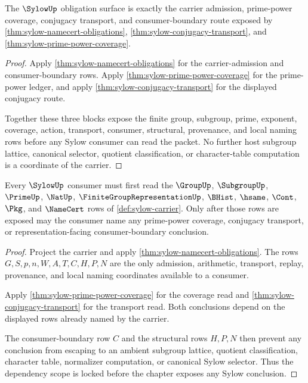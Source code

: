 \begin{theorem}
\label{thm:sylow-obligation-closure-surface}
The $\SylowUp$ obligation surface is exactly the carrier admission, prime-power coverage, conjugacy transport, and consumer-boundary route exposed by \autoref{thm:sylow-namecert-obligations}, \autoref{thm:sylow-conjugacy-transport}, and \autoref{thm:sylow-prime-power-coverage}.
\end{theorem}
\begin{proof}
Apply \autoref{thm:sylow-namecert-obligations} for the carrier-admission and consumer-boundary rows. Apply \autoref{thm:sylow-prime-power-coverage} for the prime-power ledger, and apply \autoref{thm:sylow-conjugacy-transport} for the displayed conjugacy route.

Together these three blocks expose the finite group, subgroup, prime, exponent, coverage, action, transport, consumer, structural, provenance, and local naming rows before any Sylow consumer can read the packet. No further host subgroup lattice, canonical selector, quotient classification, or character-table computation is a coordinate of the carrier.
\end{proof}

\begin{theorem}
\label{thm:sylow-scope-dependency-lock}
Every $\SylowUp$ consumer must first read the $\GroupUp$, $\SubgroupUp$, $\PrimeUp$, $\NatUp$, $\FiniteGroupRepresentationUp$, $\BHist$, $\hsame$, $\Cont$, $\Pkg$, and $\NameCert$ rows of \autoref{def:sylow-carrier}. Only after those rows are exposed may the consumer name any prime-power coverage, conjugacy transport, or representation-facing consumer-boundary conclusion.
\end{theorem}
\begin{proof}
Project the carrier and apply \autoref{thm:sylow-namecert-obligations}. The rows $G,S,p,n,W,A,T,C,H,P,N$ are the only admission, arithmetic, transport, replay, provenance, and local naming coordinates available to a consumer.

Apply \autoref{thm:sylow-prime-power-coverage} for the coverage read and \autoref{thm:sylow-conjugacy-transport} for the transport read. Both conclusions depend on the displayed rows already named by the carrier.

The consumer-boundary row $C$ and the structural rows $H,P,N$ then prevent any conclusion from escaping to an ambient subgroup lattice, quotient classification, character table, normalizer computation, or canonical Sylow selector. Thus the dependency scope is locked before the chapter exposes any Sylow conclusion.
\end{proof}

